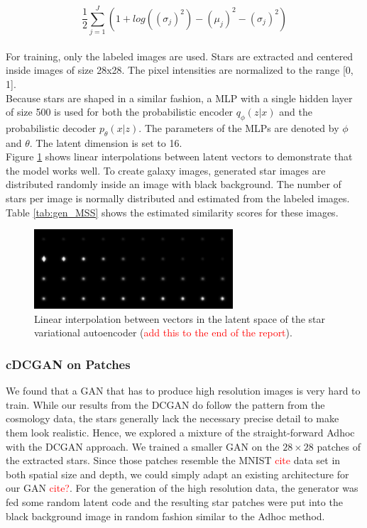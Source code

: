 \documentclass[10pt,conference,compsocconf]{IEEEtran}
\newcommand\TODO[1]{\textcolor{red}{#1}} %
\begin{document}
\[
\frac{1}{2}\sum_{j=1}^J(1 + log((\sigma_{j})^{2}) - (\mu_{j})^{2} - (\sigma_{j})^{2})
\]
\\
For training, only the labeled images are used. Stars are extracted and centered inside images of size 28x28. The pixel intensities are normalized to the range [0, 1]. \\
Because stars are shaped in a similar fashion, a MLP with a single hidden layer of size 500 is used for both the probabilistic encoder $q_{\phi}(z|x)$ and the probabilistic decoder $p_{\theta}(x|z)$. The parameters of the MLPs are denoted by $\phi$ and $\theta$. The latent dimension is set to 16. \\
Figure \ref{fig:vae_interpolation} shows linear interpolations between latent vectors to demonstrate that the model works well. To create galaxy images, generated star images are distributed randomly inside an image with black background. The number of stars per image is normally distributed and estimated from the labeled images. Table \ref{tab:gen_MSS} shows the estimated similarity scores for these images.

\begin{figure}
    \centering
    \includegraphics[width=\columnwidth]{assets/vae_interpolation.png}
    \caption{Linear interpolation between vectors in the latent space of the star variational autoencoder (\TODO{add this to the end of the report}).}
    \label{fig:vae_interpolation}
\end{figure}


\subsubsection{cDCGAN on Patches}
We found that a GAN that has to produce high resolution images is very hard to train. While our results from the DCGAN do follow the pattern from the cosmology data, the stars generally lack the necessary precise detail to make them look realistic. Hence, we explored a mixture of the straight-forward Adhoc with the DCGAN approach. We trained a smaller GAN on the $28\times28$ patches of the extracted stars. Since those patches resemble the MNIST \TODO{cite} data set in both spatial size and depth, we could simply adapt an existing architecture for our GAN \TODO{cite?}. For the generation of the high resolution data, the generator was fed some random latent code and the resulting star patches were put into the black background image in random fashion similar to the Adhoc method.
\end{document}
